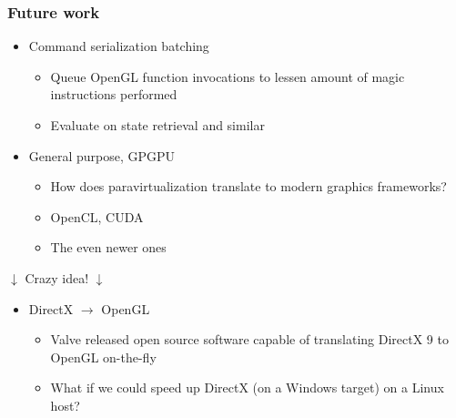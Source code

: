 \begin{frame}

\frametitle{Future work}

\begin{itemize}
  \item Command serialization batching \begin{itemize}\item Queue OpenGL function invocations to lessen amount of magic instructions performed \item Evaluate on state retrieval and similar\end{itemize}
  \item General purpose, GPGPU \begin{itemize}\item How does paravirtualization translate to modern graphics frameworks? \item OpenCL, CUDA \item The even newer ones\end{itemize}
\end{itemize}

\begin{center}$\downarrow $ Crazy idea! $\downarrow $\end{center}

\begin{itemize}
  \item DirectX $\rightarrow$ OpenGL \begin{itemize}\item Valve released open source software capable of translating DirectX 9 to OpenGL on-the-fly \item What if we could speed up DirectX (on a Windows target) on a Linux host?\end{itemize}
\end{itemize}


\end{frame}
